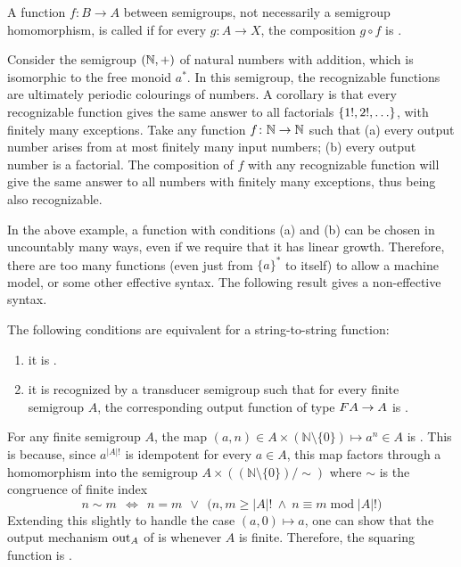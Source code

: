 \AP A function $f\colon B \to A$ between semigroups, not necessarily a semigroup
homomorphism, is called  if for every
 $g\colon A \to X$, the composition $g \circ f$ is
.

\begin{example}
  Consider the semigroup $({\mathbb N}, +)$ of natural numbers with addition, which is isomorphic to the free monoid $a^*$. In this semigroup, the recognizable functions are ultimately periodic colourings of numbers. A corollary is that every recognizable function gives the same answer to all factorials $\{1!,2!,\ldots\}$, with finitely many exceptions. Take any function $f\colon {\mathbb N} \to {\mathbb N}$ such that (a) every output number arises from at most finitely many input numbers; (b) every output number is a factorial. The composition of $f$ with any recognizable function will give the same answer to all numbers with finitely many exceptions, thus being also recognizable.
\end{example}

In the above example, a function with conditions (a) and (b) can be chosen in uncountably many ways, even if we require that it has linear growth.
Therefore, there are too many  functions (even
just from $\{a\}^*$ to itself) to
allow a machine model, or some other effective syntax. The following result
gives a non-effective syntax.

\begin{theorem}\label{thm:reco-reflecting-functions} The following conditions are equivalent for a string-to-string function:
 \begin{enumerate}
 \item \label{it:reco-refl} it is .
 \item \label{it:trans-semig-reco}it is recognized by a transducer semigroup such that for every finite semigroup $A$, the corresponding output function of type 
 $\functor A \to A$
 is .
 \end{enumerate}
\end{theorem}
\begin{example}\label{ex:squaring-reco-refl}
  For any finite semigroup $A$, the map $(a,n) \in A \times
  (\mathbb{N}\setminus\{0\}) \mapsto a^n \in A$ is . This is
  because, since $a^{|A|!}$ is idempotent for every $a\in A$, this map factors
  through a homomorphism into the semigroup $A \times
  ((\mathbb{N}\setminus\{0\})/\sim)$ where $\sim$ is the congruence of
  finite index
  \[ n \sim m ~~\iff~~ n = m ~~\lor~~ \big(n,m \geq |A|! ~\land~ n \equiv m \;\mathrm{mod}\; |A|!\big) \]
  Extending this slightly to handle the case $(a,0)\mapsto a$, one can show that the output mechanism $\mathrm{out}_A$ of  is  whenever $A$ is finite. Therefore, the squaring function is .
\end{example}
